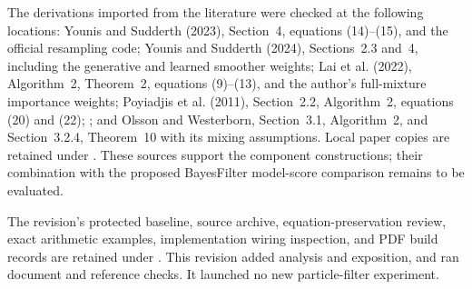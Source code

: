 \documentclass[11pt]{article}
\begin{document}
The derivations imported from the literature were checked at the following
locations: Younis and Sudderth (2023), Section~4, equations (14)--(15), and
the official resampling code; Younis and Sudderth (2024), Sections~2.3 and~4,
including the generative and learned smoother weights; Lai et al. (2022),
Algorithm~2, Theorem~2, equations (9)--(13), and the author's full-mixture
importance weights; Poyiadjis et al. (2011), Section~2.2, Algorithm~2,
equations (20) and (22); \citet[Section~4.2, equations (24)--(25)]{scibior2021dpf};
and Olsson and Westerborn, Section~3.1, Algorithm~2, and Section~3.2.4,
Theorem~10 with its mixing assumptions. Local paper copies are retained under
. These sources support the component
constructions; their combination with the proposed BayesFilter model-score
comparison remains to be evaluated.

The revision's protected baseline, source archive, equation-preservation
review, exact arithmetic examples, implementation wiring inspection, and
PDF build records are retained under
.
This revision added analysis and exposition, and ran document and reference
checks. It launched no new particle-filter experiment.


\clearpage


\end{document}

